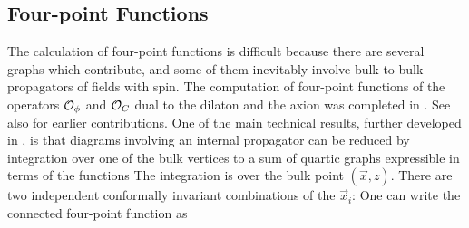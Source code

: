 \subsection{Four-point Functions}
\label{FourPointFunctions}

The calculation of four-point functions is difficult because there are
several graphs which contribute, and some of them inevitably involve
bulk-to-bulk propagators of fields with spin.  The computation of
four-point functions of the operators ${\cal O}_\phi$ and ${\cal O}_C$ dual
to the dilaton and the axion was completed in \cite{D'Hoker:1999pj}.  See
also \cite{Muck:1998rr,Liu:1999ty,Freedman:1998bj,D'Hoker:1998gd,
D'Hoker:1999jc,Liu:1998th,D'Hoker:1998mz,Chalmers:1998wu,Chalmers:1999gc,
Gonzalez-Rey:1998tk}
for earlier contributions.  One of the main technical results, further
developed in \cite{D'Hoker:1999ni}, is that diagrams involving an internal
propagator can be reduced by integration over one of the bulk vertices to a
sum of quartic graphs expressible in terms of the functions
 The integration is over the bulk point $(\vec{x},z)$.  There are two
independent conformally invariant combinations of the $\vec{x}_i$:
 One can write the connected four-point function as

